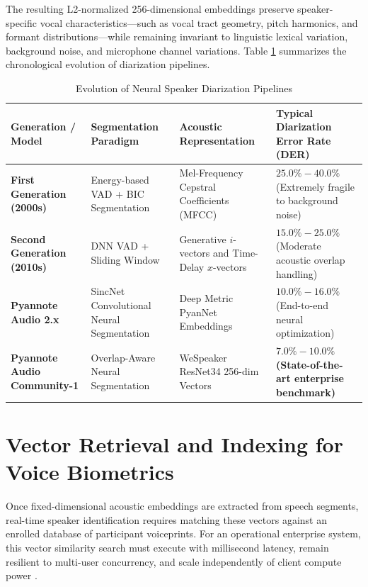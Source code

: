 \documentclass[12pt,oneside,letterpaper]{report}
\numberwithin{equation}{chapter} %
\begin{document}
The resulting L2-normalized 256-dimensional embeddings preserve speaker-specific vocal characteristics---such as vocal tract geometry, pitch harmonics, and formant distributions---while remaining invariant to linguistic lexical variation, background noise, and microphone channel variations. Table \ref{tab:diar_evolution} summarizes the chronological evolution of diarization pipelines.

\begin{table}[H]
\centering
\caption{Evolution of Neural Speaker Diarization Pipelines}
\label{tab:diar_evolution}
\footnotesize
\begin{tabularx}{\textwidth}{p{3.5cm}p{3.5cm}p{3.5cm}X}
\toprule
\textbf{Generation / Model} & \textbf{Segmentation Paradigm} & \textbf{Acoustic Representation} & \textbf{Typical Diarization Error Rate (DER)} \\
\midrule
\textbf{First Generation (2000s)} & Energy-based VAD + BIC Segmentation & Mel-Frequency Cepstral Coefficients (MFCC) & $25.0\% - 40.0\%$ (Extremely fragile to background noise) \\
\addlinespace
\textbf{Second Generation (2010s)} & DNN VAD + Sliding Window & Generative $i$-vectors and Time-Delay $x$-vectors & $15.0\% - 25.0\%$ (Moderate acoustic overlap handling) \\
\addlinespace
\textbf{Pyannote Audio 2.x} & SincNet Convolutional Neural Segmentation & Deep Metric PyanNet Embeddings & $10.0\% - 16.0\%$ (End-to-end neural optimization) \\
\addlinespace
\textbf{Pyannote Audio Community-1} & Overlap-Aware Neural Segmentation & WeSpeaker ResNet34 256-dim Vectors & \textbf{$7.0\% - 10.0\%$ (State-of-the-art enterprise benchmark)} \\
\bottomrule
\end{tabularx}
\end{table}

\section{Vector Retrieval and Indexing for Voice Biometrics}
Once fixed-dimensional acoustic embeddings are extracted from speech segments, real-time speaker identification requires matching these vectors against an enrolled database of participant voiceprints. For an operational enterprise system, this vector similarity search must execute with millisecond latency, remain resilient to multi-user concurrency, and scale independently of client compute power \cite{malkov2020efficient}.
\end{document}
